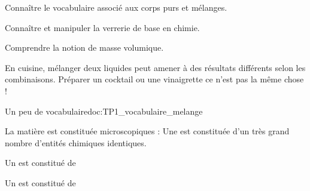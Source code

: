 \teteSndCorp

\vspace*{-36pt}


\begin{objectifs}
  \item Connaître le vocabulaire associé aux corps purs et mélanges.
  \item Connaître et manipuler la verrerie de base en chimie.
  \item Comprendre la notion de masse volumique.
\end{objectifs}

\begin{contexte}
  En cuisine, mélanger deux liquides peut amener à des résultats différents selon les combinaisons.
  Préparer un cocktail ou une vinaigrette ce n'est pas la même chose !
  
\end{contexte}


\begin{doc}{Un peu de vocabulaire}{doc:TP1_vocabulaire_melange}
  \begin{encart}
    La matière est constituée  microscopiques : 
    Une  est constituée d’un très grand nombre d’entités chimiques
identiques.
  \end{encart}
    
  \begin{encart}
    \begin{listePoints}
      \item Un  est constitué de 
      \item Un  est constitué de 
    \end{listePoints}
  \end{encart}
\end{doc}

